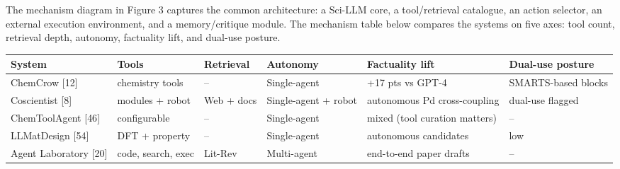 The mechanism diagram in Figure 3 captures the common architecture: a Sci-LLM core, a tool/retrieval catalogue, an action selector, an external execution environment, and a memory/critique module. The mechanism table below compares the systems on five axes: tool count, retrieval depth, autonomy, factuality lift, and dual-use posture.

{\def\LTcaptype{none} %
\begin{longtable}[]{@{}
  >{\raggedright\arraybackslash}p{}
  >{\raggedright\arraybackslash}p{}
  >{\raggedright\arraybackslash}p{}
  >{\raggedright\arraybackslash}p{}
  >{\raggedright\arraybackslash}p{}
  >{\raggedright\arraybackslash}p{}@{}}
\toprule\noalign{}
\begin{minipage}[b]{\linewidth}\raggedright
System
\end{minipage} & \begin{minipage}[b]{\linewidth}\raggedright
Tools
\end{minipage} & \begin{minipage}[b]{\linewidth}\raggedright
Retrieval
\end{minipage} & \begin{minipage}[b]{\linewidth}\raggedright
Autonomy
\end{minipage} & \begin{minipage}[b]{\linewidth}\raggedright
Factuality lift
\end{minipage} & \begin{minipage}[b]{\linewidth}\raggedright
Dual-use posture
\end{minipage} \\
\midrule\noalign{}
\endhead
\bottomrule\noalign{}
\endlastfoot
ChemCrow {[}12{]} & 18 chemistry tools & -- & Single-agent & +17 pts vs GPT-4 & SMARTS-based blocks \\
Coscientist {[}8{]} & 4 modules + robot & Web + docs & Single-agent + robot & autonomous Pd cross-coupling & dual-use flagged \\
ChemToolAgent {[}46{]} & configurable & -- & Single-agent & mixed (tool curation matters) & -- \\
LLMatDesign {[}54{]} & DFT + property & -- & Single-agent & autonomous candidates & low \\
Agent Laboratory {[}20{]} & code, search, exec & Lit-Rev & Multi-agent & end-to-end paper drafts & -- \\

\end{longtable}}
